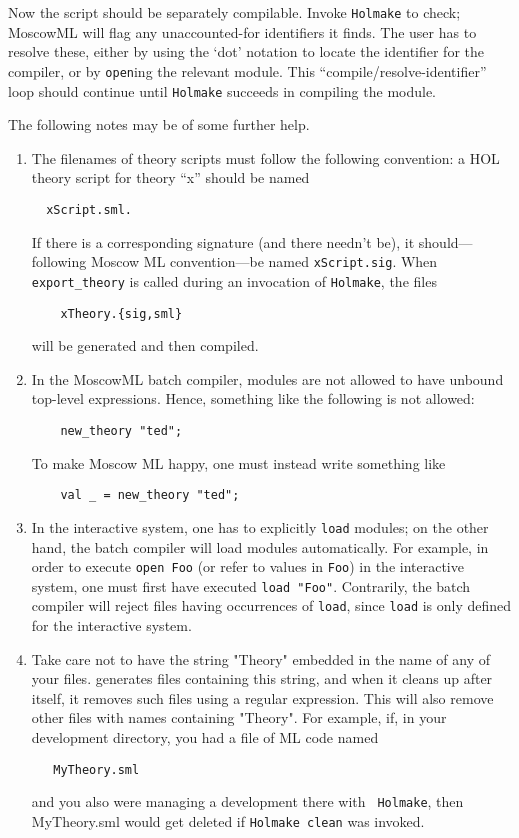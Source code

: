 Now the script should be separately compilable. Invoke {\tt Holmake}
to check; MoscowML will flag any unaccounted-for identifiers it finds.
The user has to resolve these, either by using the `dot' notation to
locate the identifier for the compiler, or by \verb+open+ing the
relevant module. This ``compile/resolve-identifier'' loop should
continue until {\tt Holmake} succeeds in compiling the module.

The following notes may be of some further help.

\begin{enumerate}
\item The filenames of theory scripts must follow the following
  convention: a HOL theory script for theory ``x'' should be named
\begin{verbatim}
  xScript.sml.
\end{verbatim}
  If there is a corresponding signature (and there needn't be), it
  should---following Moscow ML convention---be named
  \verb+xScript.sig+. When \verb+export_theory+ is called during an
  invocation of \verb+Holmake+, the files
\begin{verbatim}
    xTheory.{sig,sml}
\end{verbatim}
will be generated and then compiled.

\item In the MoscowML batch compiler, modules are not allowed to have
  unbound top-level expressions. Hence, something like the following
  is not allowed:
\begin{verbatim}
    new_theory "ted";
\end{verbatim}
To make Moscow ML happy, one must instead write something like
\begin{verbatim}
    val _ = new_theory "ted";
\end{verbatim}

\item In the interactive system, one has to explicitly \verb+load+
  modules; on the other hand, the batch compiler will load modules
  automatically.  For example, in order to execute \verb+open Foo+ (or
  refer to values in \verb+Foo+) in the interactive system, one must
  first have executed \verb+load "Foo"+. Contrarily, the batch
  compiler will reject files having occurrences of \verb+load+, since
  \verb+load+ is only defined for the interactive system.

\item Take care not to have the string "Theory" embedded in the name
  of any of your files. \holn{} generates files containing this string,
  and when it cleans up after itself, it removes such files using a
  regular expression. This will also remove other files with names
  containing "Theory". For example, if, in your development directory,
  you had a file of ML code named
\begin{verbatim}
   MyTheory.sml
\end{verbatim}
  and you also were managing a \holn{} development there with {\tt
    Holmake}, then MyTheory.sml would get deleted if {\tt Holmake
    clean} was invoked.


\end{enumerate}
